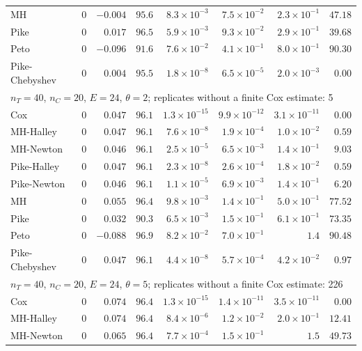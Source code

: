 \begin{landscape}
\begin{longtable}{lrrrrrrr}
MH & 0 & $-0.004$ & $95.6$ & $8.3 \times 10^{-3}$ & $7.5 \times 10^{-2}$ & $2.3 \times 10^{-1}$ & $47.18$ \\
Pike & 0 & $0.017$ & $96.5$ & $5.9 \times 10^{-3}$ & $9.3 \times 10^{-2}$ & $2.9 \times 10^{-1}$ & $39.68$ \\
Peto & 0 & $-0.096$ & $91.6$ & $7.6 \times 10^{-2}$ & $4.1 \times 10^{-1}$ & $8.0 \times 10^{-1}$ & $90.30$ \\
Pike-Chebyshev & 0 & $0.004$ & $95.5$ & $1.8 \times 10^{-8}$ & $6.5 \times 10^{-5}$ & $2.0 \times 10^{-3}$ & $0.00$ \\
\multicolumn{8}{l}{$n_T = 40$, $n_C = 20$, $E = 24$, $\theta = 2$; replicates without a finite Cox estimate: 5} \\
Cox & 0 & $0.047$ & $96.1$ & $1.3 \times 10^{-15}$ & $9.9 \times 10^{-12}$ & $3.1 \times 10^{-11}$ & $0.00$ \\
MH-Halley & 0 & $0.047$ & $96.1$ & $7.6 \times 10^{-8}$ & $1.9 \times 10^{-4}$ & $1.0 \times 10^{-2}$ & $0.59$ \\
MH-Newton & 0 & $0.046$ & $96.1$ & $2.5 \times 10^{-5}$ & $6.5 \times 10^{-3}$ & $1.4 \times 10^{-1}$ & $9.03$ \\
Pike-Halley & 0 & $0.047$ & $96.1$ & $2.3 \times 10^{-8}$ & $2.6 \times 10^{-4}$ & $1.8 \times 10^{-2}$ & $0.59$ \\
Pike-Newton & 0 & $0.046$ & $96.1$ & $1.1 \times 10^{-5}$ & $6.9 \times 10^{-3}$ & $1.4 \times 10^{-1}$ & $6.20$ \\
MH & 0 & $0.055$ & $96.4$ & $9.8 \times 10^{-3}$ & $1.4 \times 10^{-1}$ & $5.0 \times 10^{-1}$ & $77.52$ \\
Pike & 0 & $0.032$ & $90.3$ & $6.5 \times 10^{-3}$ & $1.5 \times 10^{-1}$ & $6.1 \times 10^{-1}$ & $73.35$ \\
Peto & 0 & $-0.088$ & $96.9$ & $8.2 \times 10^{-2}$ & $7.0 \times 10^{-1}$ & $1.4$ & $90.48$ \\
Pike-Chebyshev & 0 & $0.047$ & $96.1$ & $4.4 \times 10^{-8}$ & $5.7 \times 10^{-4}$ & $4.2 \times 10^{-2}$ & $0.97$ \\
\multicolumn{8}{l}{$n_T = 40$, $n_C = 20$, $E = 24$, $\theta = 5$; replicates without a finite Cox estimate: 226} \\
Cox & 0 & $0.074$ & $96.4$ & $1.3 \times 10^{-15}$ & $1.4 \times 10^{-11}$ & $3.5 \times 10^{-11}$ & $0.00$ \\
MH-Halley & 0 & $0.074$ & $96.4$ & $8.4 \times 10^{-6}$ & $1.2 \times 10^{-2}$ & $2.0 \times 10^{-1}$ & $12.41$ \\
MH-Newton & 0 & $0.065$ & $96.4$ & $7.7 \times 10^{-4}$ & $1.5 \times 10^{-1}$ & $1.5$ & $49.73$ \\

\end{longtable}
\end{landscape}

